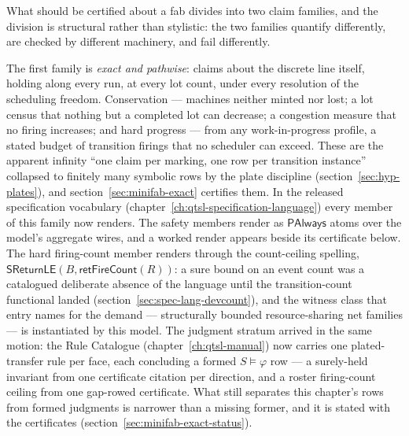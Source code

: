 What should be certified about a fab divides into two claim
families, and the division is structural rather than stylistic: the
two families quantify differently, are checked by different
machinery, and fail differently.

The first family is \emph{exact and pathwise}: claims about the
discrete line itself, holding along every run, at every lot count,
under every resolution of the scheduling freedom. Conservation ---
machines neither minted nor lost; a lot census that nothing but a
completed lot can decrease; a congestion measure that no firing
increases; and hard progress --- from any work-in-progress profile,
a stated budget of transition firings that no scheduler can exceed.
These are the apparent infinity ``one claim per marking, one row per
transition instance'' collapsed to finitely many symbolic rows by
the plate discipline (section~\ref{sec:hyp-plates}), and
section~\ref{sec:minifab-exact} certifies them. In the released
specification vocabulary
(chapter~\ref{ch:qtsl-specification-language}) every member of this
family now renders. The safety members render as $\mathsf{PAlways}$
atoms over the model's aggregate wires, and a worked render appears
beside its certificate below. The hard firing-count member renders
through the count-ceiling spelling,
$\mathsf{SReturnLE}(B, \mathsf{retFireCount}(R))$: a sure bound on
an event count was a catalogued deliberate absence of the language
until the transition-count functional landed
(section~\ref{sec:spec-lang-devcount}), and the witness class that
entry names for the demand --- structurally bounded
resource-sharing net families --- is instantiated by this model.
The judgment stratum arrived in the same motion: the Rule Catalogue
(chapter~\ref{ch:qtsl-manual}) now carries one plated-transfer rule
per face, each concluding a formed $S \models \varphi$ row --- a
surely-held invariant from one certificate citation per direction,
and a roster firing-count ceiling from one gap-rowed certificate.
What still separates this chapter's rows from formed judgments is
narrower than a missing former, and it is stated with the
certificates (section~\ref{sec:minifab-exact-status}).

